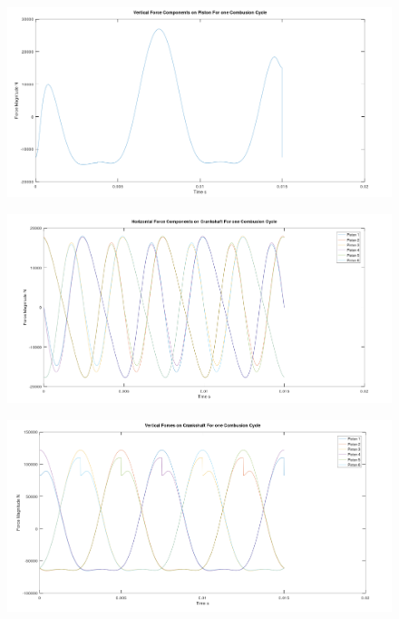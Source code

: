 \documentclass[10pt,a4paper]{article}
\begin{document}
	\begin{figure}[H]
		\centering
		\includegraphics[width=\textwidth]{Selection_359.png}
	\end{figure}
	\begin{figure}[H]
		\centering
		\includegraphics[width=\textwidth]{Selection_358.png}
	\end{figure}
	\begin{figure}[H]
		\centering
		\includegraphics[width=\textwidth]{Selection_357.png}
	\end{figure}
\newpage
\end{document}
